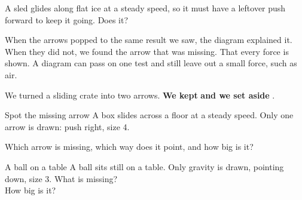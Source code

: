 \begin{center}
\end{center}

\begin{multix}[hmm]\multixbot[hmm]\tcblower
A sled glides along flat ice at a steady speed, so it must have a leftover push forward to keep it going. Does it?
\end{multix}

{When the arrows popped to the same result we saw, the diagram explained it. When they did not, we found the arrow that was missing.}
{That every force is shown. A diagram can pass on one test and still leave out a small force, such as air.}

\begin{keepbox}
We turned a sliding crate into two arrows. \textbf{We kept} \wline[3.4cm] \textbf{and we set aside} \wline[3.4cm].
\end{keepbox}

\clearpage

\begin{puzzle}{Spot the missing arrow}
A box slides across a floor at a steady speed. Only one arrow is drawn: push right, size 4.
\begin{center}
\end{center}
Which arrow is missing, which way does it point, and how big is it? \wline[4cm]
\end{puzzle}

\begin{puzzle}{A ball on a table}
A ball sits still on a table. Only gravity is drawn, pointing down, size 3. What is missing? \wline[3cm]\\
How big is it? \wline[1.5cm]
\end{puzzle}

